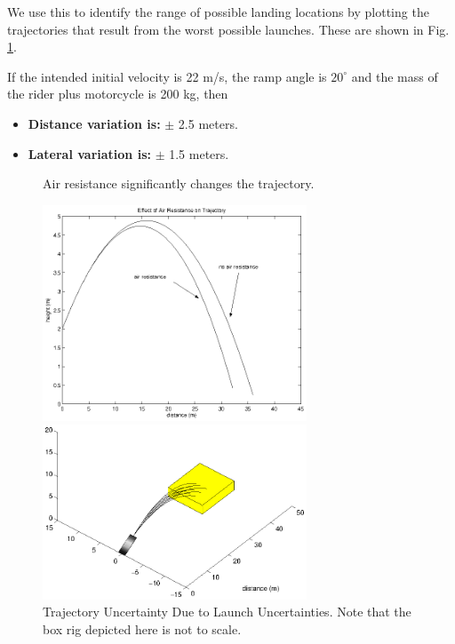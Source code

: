 \documentclass[12pt,a4paper,titlepage]{article}
\begin{document}
We use this to identify the range of possible landing locations by plotting the trajectories
that result from the worst possible launches.  These are shown in Fig. \ref{uncer}.

If the intended initial velocity is 22 m/s, the ramp angle is $20^\circ$ and the mass of the rider
plus motorcycle is 200 kg, then
\begin{itemize}
\item {\bf Distance variation is:}  $\pm$ 2.5 meters.
\item {\bf Lateral variation is:} $\pm$ 1.5 meters.
\end{itemize}

\begin{figure}
\caption{\label{correct_airres}Air resistance significantly changes the trajectory.}
\begin{center}
\includegraphics[width=0.7\textwidth]{correct_airres.eps}
\end{center}

\caption{\label{uncer}Trajectory Uncertainty Due to Launch Uncertainties.  Note that the box rig depicted here is not to scale.}
\begin{center}
\includegraphics[width=0.7\textwidth]{uncer.eps}
\end{center}
\end{figure}
\end{document}
